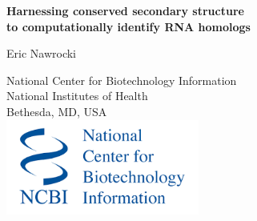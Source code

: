 \documentclass[landscape]{slides}
\begin{document}
\begin{slide}
\begin{center}
\large{\textbf{Harnessing conserved secondary structure\\to computationally identify RNA homologs}}

\normalsize

Eric Nawrocki

National Center for Biotechnology Information\\
National Institutes of Health\\
Bethesda, MD, USA\\

\vspace{1in}
\includegraphics[width=2.5in]{figs/ncbi-logo}


\medskip

\medskip

\small



\end{center}
\end{slide}
\end{document}
